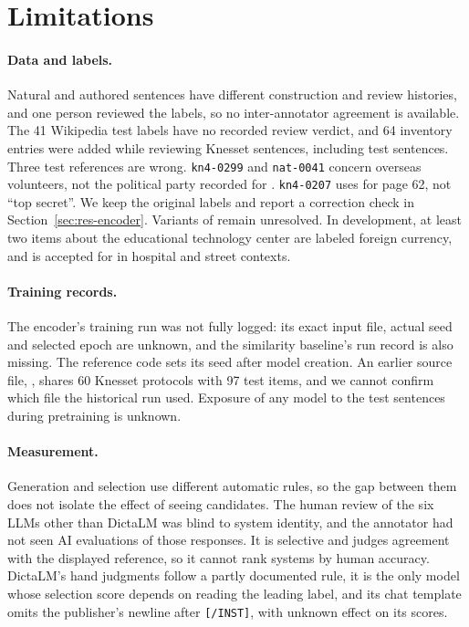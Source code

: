\section{Limitations}
\label{sec:limitations}
\paragraph{Data and labels.} Natural and authored sentences have different construction and review histories, and one person reviewed the labels, so no inter-annotator agreement is available. The 41 Wikipedia test labels have no recorded review verdict, and 64 inventory entries were added while reviewing Knesset sentences, including test sentences. Three test references are wrong. \texttt{kn4-0299} and \texttt{nat-0041} concern overseas volunteers, not the political party recorded for . \texttt{kn4-0207} uses  for page 62, not ``top secret''. We keep the original labels and report a correction check in Section~\ref{sec:res-encoder}. Variants of  remain unresolved. In development, at least two  items about the educational technology center are labeled foreign currency, and  is accepted for  in hospital and street contexts.

\paragraph{Training records.} The encoder's training run was not fully logged: its exact input file, actual seed and selected epoch are unknown, and the similarity baseline's run record is also missing. The reference code sets its seed after model creation. An earlier source file, , shares 60 Knesset protocols with 97 test items, and we cannot confirm which file the historical run used. Exposure of any model to the test sentences during pretraining is unknown.

\paragraph{Measurement.} Generation and selection use different automatic rules, so the gap between them does not isolate the effect of seeing candidates. The human review of the six LLMs other than DictaLM was blind to system identity, and the annotator had not seen AI evaluations of those responses. It is selective and judges agreement with the displayed reference, so it cannot rank systems by human accuracy. DictaLM's hand judgments follow a partly documented rule, it is the only model whose selection score depends on reading the leading label, and its chat template omits the publisher's newline after \texttt{[/INST]}, with unknown effect on its scores.

